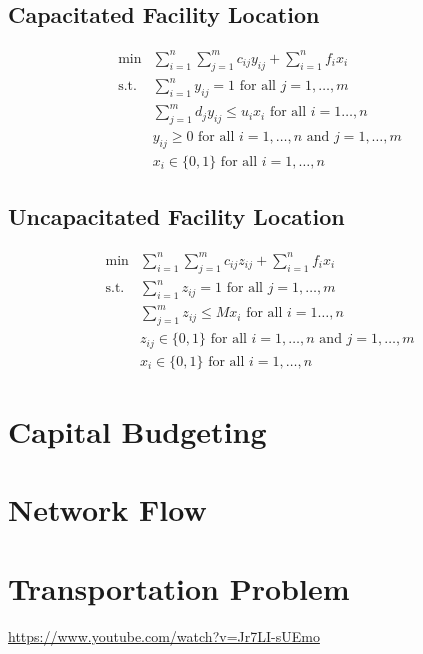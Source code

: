 \documentclass[../open-optimization/open-optimization.tex]{subfiles}
\begin{document}
\subsection{Capacitated Facility Location}
\begin{equation}
\begin{array}{rl}
\min & \displaystyle\sum_{i=1}^n\sum_{j=1}^mc_{ij}y_{ij}+\sum_{i=1}^nf_ix_i \\
\text{s.t.} & \displaystyle\sum_{i=1}^ny_{ij}=1 \text{ for all }j=1,\dots,m \\
& \displaystyle \sum_{j=1}^md_jy_{ij}\leqslant u_ix_i\text{ for all }i=1\dots,n \\
&y_{ij}\geqslant0\text{ for all }i=1,\dots,n \text{ and }j=1,\dots,m\\
&x_i\in\{0,1\}\text{ for all } i=1,\dots,n
\end{array}
\end{equation}

\subsection{Uncapacitated Facility Location}
\begin{equation}
\begin{array}{rl}
\min & \displaystyle\sum_{i=1}^n\sum_{j=1}^mc_{ij}z_{ij}+\sum_{i=1}^nf_ix_i \\
\text{s.t.} & \displaystyle\sum_{i=1}^nz_{ij}=1 \text{ for all }j=1,\dots,m \\
& \displaystyle \sum_{j=1}^mz_{ij}\leqslant Mx_i\text{ for all }i=1\dots,n \\
&z_{ij}\in\{0,1\}\text{ for all }i=1,\dots,n \text{ and }j=1,\dots,m\\
&x_i\in\{0,1\}\text{ for all } i=1,\dots,n
\end{array}
\end{equation}


\section{Capital Budgeting}







\section{Network Flow}

\section{Transportation Problem}
\url{https://www.youtube.com/watch?v=Jr7LI-sUEmo}
\end{document}
